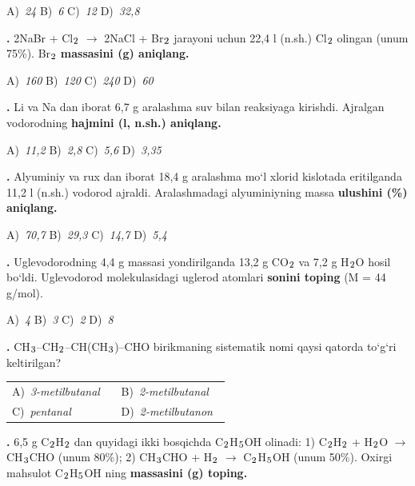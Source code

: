 \documentclass[11pt,a4paper]{article}
\renewcommand{\textsubscript}[1]{\ensuremath{_{\text{\fontsize{8}{8}\selectfont #1}}}}
\newcommand{\qn}[1]{\textbf{\fontsize{11.5}{13}\selectfont #1}}
\newcommand{\qsep}{\par\vspace{1pt}\noindent\rule{0pt}{0.4pt}\par\vspace{5pt}}
\begin{document}
\begin{multicols}{2}
\noindent A)~\textsl{24} \hfill B)~\textsl{6} \hfill C)~\textsl{12} \hfill D)~\textsl{32,8}\par
\qsep
\noindent\qn{17.} 2NaBr + Cl\textsubscript{2} $\to$ 2NaCl + Br\textsubscript{2} jarayoni uchun 22,4 l (n.sh.) Cl\textsubscript{2} olingan (unum 75\%). Br\textsubscript{2} \textbf{massasini (g) aniqlang.}

\noindent A)~\textsl{160} \hfill B)~\textsl{120} \hfill C)~\textsl{240} \hfill D)~\textsl{60}\par
\qsep
\noindent\qn{18.} Li va Na dan iborat 6,7 g aralashma suv bilan reaksiyaga kirishdi. Ajralgan vodorodning \textbf{hajmini (l, n.sh.) aniqlang.}

\noindent A)~\textsl{11,2} \hfill B)~\textsl{2,8} \hfill C)~\textsl{5,6} \hfill D)~\textsl{3,35}\par
\qsep
\noindent\qn{19.} Alyuminiy va rux dan iborat 18,4 g aralashma mo`l xlorid kislotada eritilganda 11,2 l (n.sh.) vodorod ajraldi. Aralashmadagi alyuminiyning massa \textbf{ulushini (\%) aniqlang.}

\noindent A)~\textsl{70,7} \hfill B)~\textsl{29,3} \hfill C)~\textsl{14,7} \hfill D)~\textsl{5,4}\par
\qsep
\noindent\qn{20.} Uglevodorodning 4,4 g massasi yondirilganda 13,2 g CO\textsubscript{2} va 7,2 g H\textsubscript{2}O hosil bo`ldi. Uglevodorod molekulasidagi uglerod atomlari \textbf{sonini toping} (M = 44 g/mol).

\noindent A)~\textsl{4} \hfill B)~\textsl{3} \hfill C)~\textsl{2} \hfill D)~\textsl{8}\par
\qsep
\noindent\qn{21.} CH\textsubscript{3}--CH\textsubscript{2}--CH(CH\textsubscript{3})--CHO birikmaning sistematik nomi qaysi qatorda to`g`ri keltirilgan?

\noindent\begin{tabular}{@{}p{0.47\linewidth}@{}p{0.47\linewidth}@{}}
A)~\textsl{3-metilbutanal} & B)~\textsl{2-metilbutanal} \\
C)~\textsl{pentanal} & D)~\textsl{2-metilbutanon} \\
\end{tabular}\par
\qsep
\noindent\qn{22.} 6,5 g C\textsubscript{2}H\textsubscript{2} dan quyidagi ikki bosqichda C\textsubscript{2}H\textsubscript{5}OH olinadi: 1) C\textsubscript{2}H\textsubscript{2} + H\textsubscript{2}O $\to$ CH\textsubscript{3}CHO (unum 80\%); 2) CH\textsubscript{3}CHO + H\textsubscript{2} $\to$ C\textsubscript{2}H\textsubscript{5}OH (unum 50\%). Oxirgi mahsulot C\textsubscript{2}H\textsubscript{5}OH ning \textbf{massasini (g) toping.}


\end{multicols}
\end{document}
